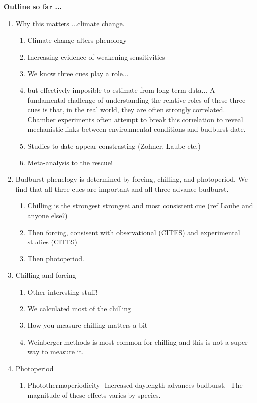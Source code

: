 \documentclass[11pt,letter]{article}
\begin{document}
{\bf Outline so far ...}

\begin{enumerate}
\item Why this matters ...climate change.
\begin{enumerate}
\item Climate change alters phenology
\item Increasing evidence of weakening sensitivities
\item We know three cues play a role...
\item but effectively imposible to estimate from long term data... A fundamental challenge of understanding the relative roles of these three cues is that, in the real world, they are often strongly correlated. Chamber experiments often attempt to break this correlation to reveal mechanistic links between environmental conditions and budburst date. 
\item Studies to date appear constrasting (Zohner, Laube etc.)
\item Meta-analysis to the rescue!
\end{enumerate}
\item Budburst phenology is determined by forcing, chilling, and photoperiod. We find that all three cues are important and all three advance budburst.
\begin{enumerate}
\item Chilling is the strongest strongset and most consistent cue (ref Laube and anyone else?)
\item Then forcing, consisent with observational (CITES) and experimental studies (CITES)
\item Then photoperiod.
\end{enumerate}
\item Chilling and forcing
\begin{enumerate}
\item Other interesting stuff!
\item We calculated most of the chilling
\item How you measure chilling matters a bit
\item Weinberger methods is most common for chilling and this is not a super way to measure it.
\end{enumerate}
\item Photoperiod
\begin{enumerate}
\item Photothermoperiodicity
-Increased daylength advances budburst.
-The magnitude of these effects varies by species.

\end{enumerate}
\end{enumerate}
\end{document}

